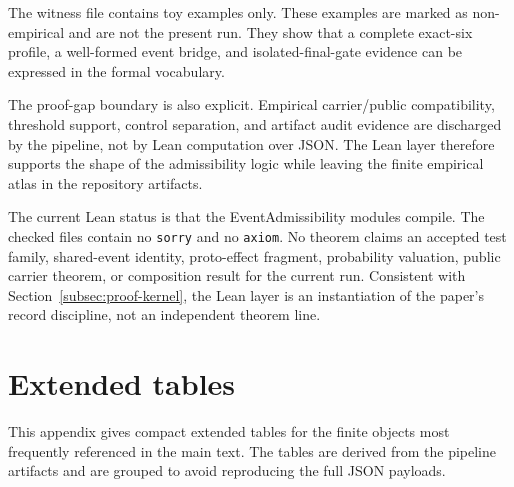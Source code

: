 \documentclass[11pt]{article}
\theoremstyle{definition}
\begin{document}
The witness file contains toy examples only. These examples are marked as non-empirical and are not the present run. They show that a complete exact-six profile, a well-formed event bridge, and isolated-final-gate evidence can be expressed in the formal vocabulary.

The proof-gap boundary is also explicit. Empirical carrier/public compatibility, threshold support, control separation, and artifact audit evidence are discharged by the pipeline, not by Lean computation over JSON. The Lean layer therefore supports the shape of the admissibility logic while leaving the finite empirical atlas in the repository artifacts.

The current Lean status is that the EventAdmissibility modules compile. The checked files contain no \texttt{sorry} and no \texttt{axiom}. No theorem claims an accepted test family, shared-event identity, proto-effect fragment, probability valuation, public carrier theorem, or composition result for the current run. Consistent with Section~\ref{subsec:proof-kernel}, the Lean layer is an instantiation of the paper's record discipline, not an independent theorem line.
 \section{Extended tables}
\label{app:extended-tables}

This appendix gives compact extended tables for the finite objects most frequently referenced in the main text. The tables are derived from the pipeline artifacts and are grouped to avoid reproducing the full JSON payloads.
\end{document}
